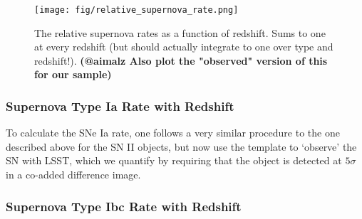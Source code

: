 \documentclass[12pt, twocolumn]{emulateapj}
\begin{document}
\begin{appendix}
\begin{figure}
	\begin{center}
		\texttt{[image: fig/relative\_supernova\_rate.png]}
		\caption{The relative supernova rates as a function of redshift. 
		Sums to one at every redshift (but should actually integrate to one over type and redshift!).  \textbf{(@aimalz Also plot the "observed" version of this for our sample)}}
		\label{fig:relative_supernova_rates}
	\end{center}
\end{figure}


\subsubsection{Supernova Type Ia Rate with Redshift}
\label{sec:TypeIaRate}

To calculate the SNe Ia rate, one follows a very similar procedure to the one described above for the SN II objects, but now use the \cite{Hsiao2007} template to `observe' the SN with LSST, which we quantify by requiring that the object is detected at $5\sigma$ in a co-added difference image.

\subsubsection{Supernova Type Ibc Rate with Redshift}
\label{sec:TypeIbcRate}

\end{appendix}


\end{document}
